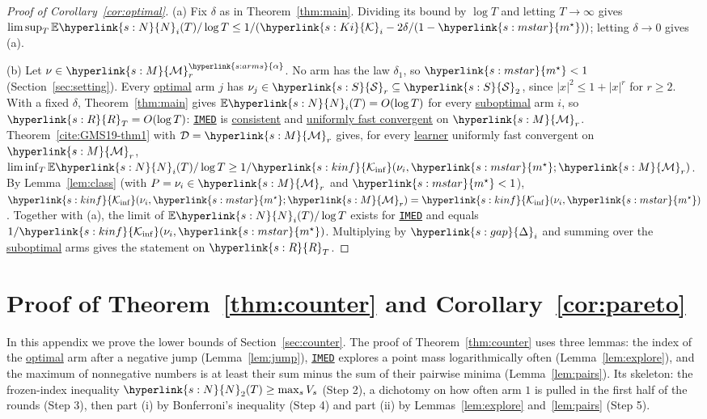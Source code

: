 \documentclass[11pt]{article}
\newcommand{\E}{\mathbb{E}}
\newcommand{\sy}[2]{{\hyperlink{#1}{#2}}}
\newcommand{\term}[2]{\hyperlink{#1}{#2}}
\newcommand{\imed}{\hyperref[alg:imed]{\texttt{IMED}}}
\newcommand{\Sm}{\sy{s:S}{\mathcal{S}}}
\newcommand{\Mm}{\sy{s:M}{\mathcal{M}}}
\newcommand{\arms}{\sy{s:arms}{\alpha}}
\newcommand{\ms}{\sy{s:mstar}{m^{\star}}}
\newcommand{\gap}{\sy{s:gap}{\Delta}}
\newcommand{\Kinf}{\sy{s:kinf}{\mathcal{K}_{\inf}}}
\newcommand{\Np}{\sy{s:N}{N}}
\newcommand{\Reg}{\sy{s:R}{R}}
\newcommand{\Ki}{\sy{s:Ki}{\mathcal{K}}}
\begin{document}
\begin{proof}[Proof of Corollary~\ref{cor:optimal}]
(a) Fix $\delta$ as in Theorem~\ref{thm:main}. Dividing its bound by $\log T$ and letting
$T\to\infty$ gives $\limsup_T\E \Np_i(T)/\log T\le1/(\Ki_i-2\delta/(1-\ms))$; letting $\delta\to0$
gives (a).

(b) Let $\nu\in\Mm_r^\arms$. No arm has the law $\delta_1$, so $\ms<1$ (Section~\ref{sec:setting}).
Every \term{w:optimal}{optimal} arm $j$ has $\nu_j\in\Sm_r\subseteq\Sm_2$, since $|x|^2\le1+|x|^r$ for $r\ge2$. With a
fixed $\delta$, Theorem~\ref{thm:main} gives $\E \Np_i(T)=O(\log T)$ for every \term{w:subopt}{suboptimal} arm $i$, so
$\Reg_T=O(\log T)$: \imed{} is \term{w:consistent}{consistent} and \term{w:ufc}{uniformly fast convergent} on $\Mm_r$.
Theorem~\ref{cite:GMS19-thm1} with $\mathcal D=\Mm_r$ gives, for every \term{w:learner}{learner} uniformly fast
convergent on $\Mm_r$, $\liminf_T\E \Np_i(T)/\log T\ge1/\Kinf(\nu_i,\ms;\Mm_r)$. By
Lemma~\ref{lem:class} (with $P=\nu_i\in\Mm_r$ and $\ms<1$),
$\Kinf(\nu_i,\ms;\Mm_r)=\Kinf(\nu_i,\ms)$. Together with (a), the limit of $\E \Np_i(T)/\log T$
exists for \imed{} and equals $1/\Kinf(\nu_i,\ms)$. Multiplying by $\gap_i$ and summing over the
\term{w:subopt}{suboptimal} arms gives the statement on $\Reg_T$.
\end{proof}

\section{Proof of Theorem~\ref{thm:counter} and Corollary~\ref{cor:pareto}}\label{sec:proofs-counter}

In this appendix we prove the lower bounds of Section~\ref{sec:counter}. The proof of
Theorem~\ref{thm:counter} uses three lemmas: the index of the \term{w:optimal}{optimal} arm after a negative jump
(Lemma~\ref{lem:jump}), \imed{} explores a point mass logarithmically often
(Lemma~\ref{lem:explore}), and the maximum of nonnegative numbers is at least their sum minus the sum
of their pairwise minima (Lemma~\ref{lem:pairs}). Its skeleton: the frozen-index inequality
$\Np_2(T)\ge\max_sV_s$ (Step 2), a dichotomy on how often arm $1$ is pulled in the first half of the
rounds (Step 3), then part (i) by Bonferroni's inequality (Step 4) and part (ii) by
Lemmas~\ref{lem:explore} and~\ref{lem:pairs} (Step 5).
\end{document}
